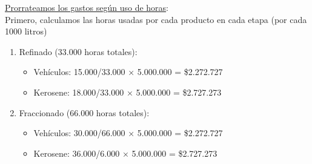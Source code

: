 \documentclass[10pt,a4paper]{article}
\begin{document}
\begin{enumerate}
\begin{itemize}
    \end{itemize}

    \underline{Prorrateamos los gastos según uso de horas}: \\

    Primero, calculamos las horas usadas por cada producto en cada etapa (por cada 1000 litros)

    \begin{center}
    \end{center}

    \clearpage

    \begin{enumerate}[label=\alph*)]

        \item Refinado (33.000 horas totales):
        
        \begin{itemize}

            \item Vehículos: 15.000/33.000 × 5.000.000 = \$2.272.727
            \item Kerosene: 18.000/33.000 × 5.000.000 = \$2.727.273 \\
    
        \end{itemize}

        \item Fraccionado (66.000 horas totales):
        
        \begin{itemize}

            \item Vehículos: 30.000/66.000 × 5.000.000 = \$2.272.727
            \item Kerosene: 36.000/6.000 × 5.000.000 = \$2.727.273 \\
    

\end{itemize}
\end{enumerate}
\end{enumerate}
\end{document}
